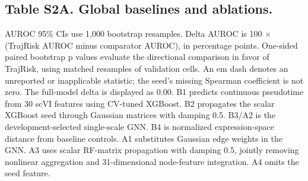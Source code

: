 \subsection*{Table S2A. Global baselines and ablations.}\label{tab:S2A}
\noindent AUROC 95\% CIs use 1,000 bootstrap resamples. Delta AUROC is 100 \(\times\) (TrajRisk AUROC minus comparator AUROC), in percentage points. One-sided paired bootstrap p values evaluate the directional comparison in favor of TrajRisk, using matched resamples of validation cells. An em dash denotes an unreported or inapplicable statistic; the seed's missing Spearman coefficient is not zero. The full-model delta is displayed as 0.00. B1 predicts continuous pseudotime from 30 scVI features using CV-tuned XGBoost. B2 propagates the scalar XGBoost seed through Gaussian matrices with damping 0.5. B3/\allowbreak{}A2 is the development-selected single-scale GNN. B4 is normalized expression-space distance from baseline controls. A1 substitutes Gaussian edge weights in the GNN. A3 uses scalar RF-matrix propagation with damping 0.5, jointly removing nonlinear aggregation and 31-dimensional node-feature integration. A4 omits the seed feature.

